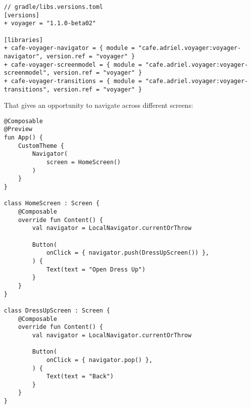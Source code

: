 \begin{lstlisting}
// gradle/libs.versions.toml
[versions]
+ voyager = "1.1.0-beta02"

[libraries]
+ cafe-voyager-navigator = { module = "cafe.adriel.voyager:voyager-navigator", version.ref = "voyager" }
+ cafe-voyager-screenmodel = { module = "cafe.adriel.voyager:voyager-screenmodel", version.ref = "voyager" }
+ cafe-voyager-transitions = { module = "cafe.adriel.voyager:voyager-transitions", version.ref = "voyager" }
\end{lstlisting}

\noindent That gives an opportunity to navigate across different screens:

\begin{lstlisting}
@Composable
@Preview
fun App() {
    CustomTheme {
        Navigator(
            screen = HomeScreen()
        )
    }
}

class HomeScreen : Screen {
    @Composable
    override fun Content() {
        val navigator = LocalNavigator.currentOrThrow

        Button(
            onClick = { navigator.push(DressUpScreen()) },
        ) {
            Text(text = "Open Dress Up")
        }
    }
}

class DressUpScreen : Screen {
    @Composable
    override fun Content() {
        val navigator = LocalNavigator.currentOrThrow

        Button(
            onClick = { navigator.pop() },
        ) {
            Text(text = "Back")
        }
    }
}
\end{lstlisting}
